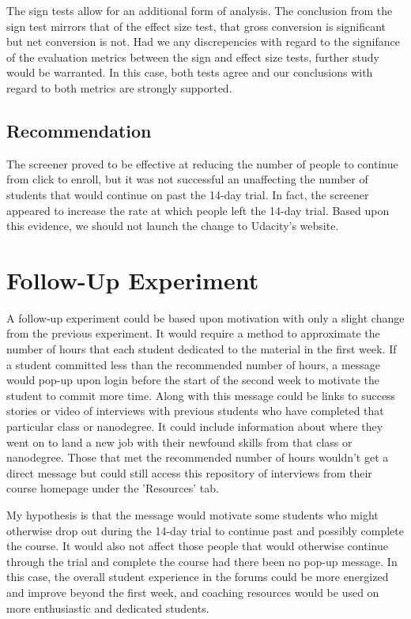 \documentclass[paper=a4, fontsize=11pt]{scrartcl} %
\numberwithin{equation}{section} %
\numberwithin{figure}{section} %
\numberwithin{table}{section} %
\begin{document}
The sign tests allow for an additional form of analysis.  The conclusion from the sign test mirrors that of the effect size test, that gross conversion is significant but net conversion is not.  Had we any discrepencies with regard to the signifance of the evaluation metrics between the sign and effect size tests, further study would be warranted.  In this case, both tests agree and our conclusions with regard to both metrics are strongly supported.


\subsection{Recommendation}

The screener proved to be effective at reducing the number of people to continue from click to enroll, but it was not successful an unaffecting the number of students that would continue on past the 14-day trial.  In fact, the screener appeared to increase the rate at which people left the 14-day trial.  Based upon this evidence, we should not launch the change to Udacity's website. \newline


\section{Follow-Up Experiment}

A follow-up experiment could be based upon motivation with only a slight change from the previous experiment.  It would require a method to approximate the number of hours that each student dedicated to the material in the first week.  If a student committed less than the recommended number of hours, a message would pop-up upon login before the start of the second week to motivate the student to commit more time.  Along with this message could be links to success stories or video of interviews with previous students who have completed that particular class or nanodegree.  It could include information about where they went on to land a new job with their newfound skills from that class or nanodegree.  Those that met the recommended number of hours wouldn't get a direct message but could still access this repository of interviews from their course homepage under the 'Resources' tab. \newline

My hypothesis is that the message would motivate some students who might otherwise drop out during the 14-day trial to continue past and possibly complete the course.  It would also not affect those people that would otherwise continue through the trial and complete the course had there been no pop-up message.  In this case, the overall student experience in the forums could be more energized and improve beyond the first week, and coaching resources would be used on more enthusiastic and dedicated students. \newline
\end{document}
